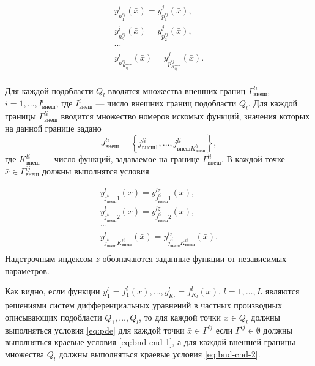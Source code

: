 \documentclass[a4paper,12pt]{article}
\begin{document}
\begin{equation}
    \begin{array}{ll}
        y^i_{n^{ij}_1}(\bar{x})=y^j_{p^{ij}_1}(\bar{x}),\\
        y^i_{n^{ij}_2}(\bar{x})=y^j_{p^{ij}_2}(\bar{x}),\\
        \cdots \\
        y^i_{n^{ij}_{K^{соот}_{ij}}}(\bar{x})=
        y^j_{p^{ij}_{K^{соот}_{ij}}}(\bar{x}).\\
    \end{array}
    \label{eq:bnd-cnd-1}
\end{equation}

Для каждой подобласти $Q_l$ вводятся множества внешних границ 
$\Gamma^{li}_{внеш}$, $i=1,\ldots,I^{l}_{внеш}$, где $I^l_{внеш}$ --- число
внешних границ подобласти $Q_l$. Для каждой границы $\Gamma^{li}_{внеш}$ 
вводится множество номеров искомых функций, значения которых на данной
границе задано $$J^{li}_{внеш}=\left\{j^{li}_{внеш 1},\ldots,
j^{li}_{внеш K^{li}_{внеш}}\right\},$$ где $K^{li}_{внеш}$ --- число 
функций, задаваемое на границе $\Gamma^{li}_{внеш}$. В каждой точке
$\bar{x} \in \Gamma^{ij}_{внеш}$ должны выполнятся условия

\begin{equation}
    \begin{array}{ll}
        y^l_{j^{li}_{внеш }1}(\bar{x})=
          y^{lz}_{j^{li}_{внеш }1}(\bar{x}),\\
        y^l_{j^{li}_{внеш }2}(\bar{x})=
          y^{lz}_{j^{li}_{внеш }2}(\bar{x}),\\
        \cdots \\
        y^l_{j^{li}_{внеш} K^{li}_{внеш}}(\bar{x})=
        y^{lz}_{j^{li}_{внеш} K^{li}_{внеш}}(\bar{x}).\\
    \end{array}
    \label{eq:bnd-cnd-2}
\end{equation}
Надстрочным индексом $z$ обозначаются заданные функции от независимых
параметров.

Как видно, если функции $y^l_1=f^l_1(x),\ldots,y^l_{K_l}=f^l_{K_l}(x)$,
$l=1,\ldots,L$ являются решениями систем дифференциальных уравнений в
частных производных описывающих подобласти $Q_1,\ldots,Q_l$, то для
каждой точки $x \in Q_l$ должны выполняться условия \eqref{eq:pde} для
каждой точки $\bar{x} \in \Gamma^{ij}$ если $\Gamma^{ij} \in \emptyset$
должны выполняться краевые условия \eqref{eq:bnd-cnd-1}, а для каждой 
внешней границы множества $Q_l$ должны выполняться краевые условия
\eqref{eq:bnd-cnd-2}. 
\end{document}
